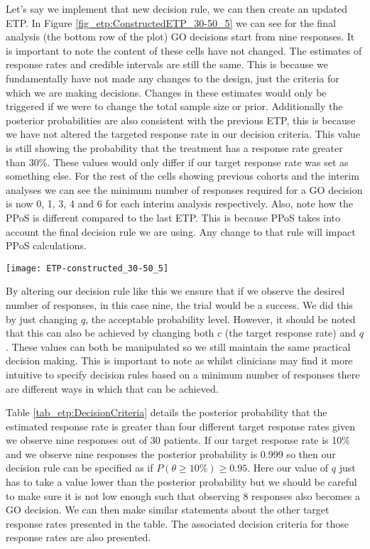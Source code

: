 Let's say we implement that new decision rule, we can then create an updated ETP. In Figure \ref{fig_etp:ConstructedETP_30-50_5} we can see for the final analysis (the bottom row of the plot) GO decisions start from nine responses. It is important to note the content of these cells have not changed. The estimates of response rates and credible intervals are still the same. This is because we fundamentally have not made any changes to the design, just the criteria for which we are making decisions. Changes in these estimates would only be triggered if we were to change the total sample size or prior. Additionally the posterior probabilities are also consistent with the previous ETP, this is because we have not altered the targeted response rate in our decision criteria. This value is still showing the probability that the treatment has a response rate greater than 30\%. These values would only differ if our target response rate was set as something else. For the rest of the cells showing previous cohorts and the interim analyses we can see the minimum number of responses required for a GO decision is now 0, 1, 3, 4 and 6 for each interim analysis respectively. Also, note how the PPoS is different compared to the last ETP. This is because PPoS takes into account the final decision rule we are using. Any change to that rule will impact PPoS calculations. 

\begin{sidewaysfigure}
	\centering
	\caption{ETP with updated final decision rule.}
	\label{fig_etp:ConstructedETP_30-50_5}
	\texttt{[image: ETP-constructed\_30-50\_5]}
\end{sidewaysfigure}

By altering our decision rule like this we ensure that if we observe the desired number of responses, in this case nine, the trial would be a success. We did this by just changing $q$, the acceptable probability level. However, it should be noted that this can also be achieved by changing both $c$ (the target response rate) and $q$. These values can both be manipulated so we still maintain the same practical decision making. This is important to note as whilst clinicians may find it more intuitive to specify decision rules based on a minimum number of responses there are different ways in which that can be achieved. 

Table \ref{tab_etp:DecisionCriteria} details the posterior probability that the estimated response rate is greater than four different target response rates given we observe nine responses out of 30 patients. If our target response rate is 10\% and we observe nine responses the posterior probability is 0.999 so then our decision rule can be specified as if $P(\theta  \geq 10\%) \geq 0.95$. Here our value of $q$ just has to take a value lower than the posterior probability but we should be careful to make sure it is not low enough such that observing 8 responses also becomes a GO decision. We can then make similar statements about the other target response rates presented in the table. The associated decision criteria for those response rates are also presented. 

